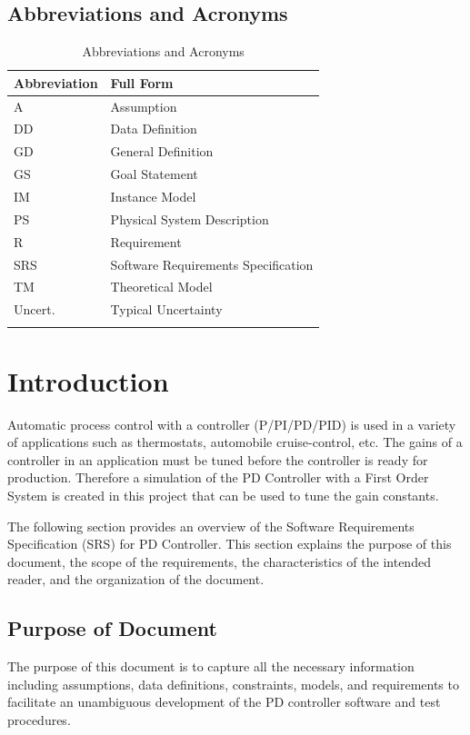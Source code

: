 \documentclass[12pt]{article}
\begin{document}
\subsection{Abbreviations and Acronyms}
\label{Sec:TAbbAcc}
\begin{longtable}{l l}
\toprule
\textbf{Abbreviation} & \textbf{Full Form}
\\
\midrule
\endhead
A & Assumption
\\
DD & Data Definition
\\
GD & General Definition
\\
GS & Goal Statement
\\
IM & Instance Model
\\
PS & Physical System Description
\\
R & Requirement
\\
SRS & Software Requirements Specification
\\
TM & Theoretical Model
\\
Uncert. & Typical Uncertainty
\\
\bottomrule
\caption{Abbreviations and Acronyms}
\label{Table:TAbbAcc}
\end{longtable}
\section{Introduction}
\label{Sec:Intro}
Automatic process control with a controller (P/PI/PD/PID) is used  in a variety of applications such as thermostats, automobile  cruise-control, etc. The gains of a controller in an application  must be tuned before the controller is ready for production. Therefore a simulation of the  PD Controller  with a  First Order System is created in this project that can be  used to tune the gain constants.

The following section provides an overview of the Software Requirements Specification (SRS) for PD Controller. This section explains the purpose of this document, the scope of the requirements, the characteristics of the intended reader, and the organization of the document.

\subsection{Purpose of Document}
\label{Sec:DocPurpose}
The purpose of this document is to capture all the necessary  information including assumptions, data definitions, constraints,  models, and requirements to facilitate an unambiguous development  of the PD controller software and test procedures.
\end{document}

